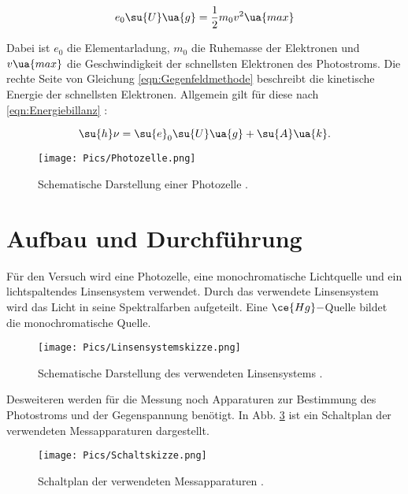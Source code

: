 \begin{equation}
  \label{eqn:Gegenfeldmethode}
  e_0\su{U}\ua{g} = \frac{1}{2}m_0 v^2\ua{max}
\end{equation}

Dabei ist $e_0$ die Elementarladung, $m_0$ die Ruhemasse der Elektronen und
$v\ua{max}$ die Geschwindigkeit der schnellsten Elektronen des Photostroms.
Die rechte Seite von Gleichung \eqref{eqn:Gegenfeldmethode} beschreibt die
kinetische Energie der schnellsten Elektronen. Allgemein gilt für diese nach
\eqref{eqn:Energiebillanz} :

\begin{equation}
  \label{eqn:Energie_schnelle_e}
\su{h}\nu = \su{e}_0 \su{U}\ua{g} + \su{A}\ua{k}.
\end{equation}

\begin{figure}
  \centering
  \texttt{[image: Pics/Photozelle.png]}
  \caption{Schematische Darstellung einer Photozelle \cite{anleitung01}.}
  \label{fig:Photozelle}
\end{figure}

\section{Aufbau und Durchführung}

Für den Versuch wird eine Photozelle, eine monochromatische Lichtquelle und
ein lichtspaltendes Linsensystem verwendet.
Durch das verwendete Linsensystem wird das
Licht in seine Spektralfarben aufgeteilt. Eine $\ce{Hg}-$Quelle bildet die
monochromatische Quelle.

\begin{figure}
  \centering
  \texttt{[image: Pics/Linsensystemskizze.png]}
  \caption{Schematische Darstellung des verwendeten Linsensystems \cite{anleitung01}.}
  \label{fig:Linsensystem}
\end{figure}

Desweiteren werden für die Messung noch Apparaturen zur Bestimmung des Photostroms
und der Gegenspannung benötigt. In Abb. \ref{fig:Schaltskizze} ist ein Schaltplan
der verwendeten Messapparaturen dargestellt.

\begin{figure}
  \centering
  \texttt{[image: Pics/Schaltskizze.png]}
  \caption{Schaltplan der verwendeten Messapparaturen \cite{anleitung01}.}
  \label{fig:Schaltskizze}
\end{figure}
\FloatBarrier

